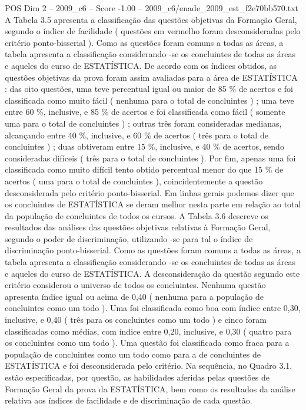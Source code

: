 \begin{textsample}{POS Dim 2 – 2009\_c6 – Score -1.00 – 2009\_c6/enade\_2009\_est\_f2e70bb570.txt}
A Tabela 3.5 apresenta a classificação das questões objetivas da Formação Geral, segundo o índice de facilidade ( questões em vermelho foram desconsideradas pelo critério ponto-bisserial ).
Como as questões foram comuns a todas as áreas, a tabela apresenta a classificação considerando -se os concluintes de todas as áreas e aqueles do curso de ESTATÍSTICA.
De acordo com os índices obtidos, as questões objetivas da prova foram assim avaliadas para a área de ESTATÍSTICA : das oito questões, uma teve percentual igual ou maior de 85 \% de acertos e foi classificada como muito fácil ( nenhuma para o total de concluintes ) ; uma teve entre 60 \%, inclusive, e 85 \% de acertos e foi classificada como fácil ( somente uma para o total de concluintes ) ; outras três foram consideradas medianas, alcançando entre 40 \%, inclusive, e 60 \% de acertos ( três para o total de concluintes ) ; duas obtiveram entre 15 \%, inclusive, e 40 \% de acertos, sendo consideradas difíceis ( três para o total de concluintes ).
Por fim, apenas uma foi classificada como muito difícil tento obtido percentual menor do que 15 \% de acertos ( uma para o total de concluintes ), coincidentemente a questão desconsiderada pelo critério ponto-bisserial.
Em linhas gerais podemos dizer que os concluintes de ESTATÍSTICA se deram melhor nesta parte em relação ao total da população de concluintes de todos os cursos.
A Tabela 3.6 descreve os resultados das análises das questões objetivas relativas à Formação Geral, segundo o poder de discriminação, utilizando -se para tal o índice de discriminação ponto-bisserial.
Como as questões foram comuns a todas as áreas, a tabela apresenta a classificação considerando -se os concluintes de todas as áreas e aqueles do curso de ESTATÍSTICA.
A desconsideração da questão segundo este critério considerou o universo de todos os concluintes.
Nenhuma questão apresenta índice igual ou acima de 0,40 ( nenhuma para a população de concluintes como um todo ).
Uma foi classificada como boa com índice entre 0,30, inclusive, e 0,40 ( três para os concluintes como um todo ) e cinco foram classificadas como médias, com índice entre 0,20, inclusive, e 0,30 ( quatro para os concluintes como um todo ).
Uma questão foi classificada como fraca para a população de concluintes como um todo como para a de concluintes de ESTATÍSTICA e foi desconsiderada pelo critério.
Na sequência, no Quadro 3.1, estão especificadas, por questão, as habilidades aferidas pelas questões de Formação Geral da prova da ESTATÍSTICA, bem como os resultados da análise relativa aos índices de facilidade e de discriminação de cada questão.

\end{textsample}
